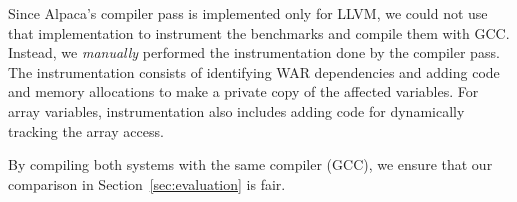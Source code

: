 Since Alpaca's compiler pass is implemented only for LLVM, we could not use that implementation to instrument the benchmarks and compile them with GCC. Instead, we \emph{manually} performed the instrumentation done by the compiler pass. The instrumentation consists of identifying WAR dependencies  and adding code and memory allocations to make a private copy of the affected variables.  For array variables, instrumentation also includes adding code for dynamically tracking the array access. 

%
%
By compiling both systems with the same compiler (GCC), we ensure that our comparison in Section~\ref{sec:evaluation} is fair.
